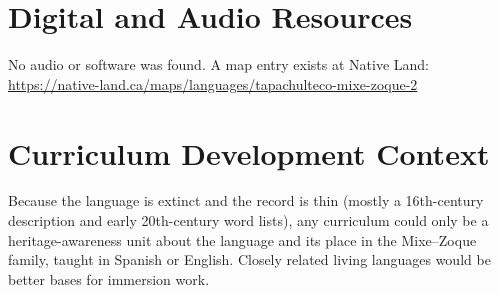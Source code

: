\documentclass[12pt]{article}
\begin{document}
\section{Digital and Audio Resources}
No audio or software was found. A map entry exists at Native Land: \url{https://native-land.ca/maps/languages/tapachulteco-mixe-zoque-2}

\section{Curriculum Development Context}
Because the language is extinct and the record is thin (mostly a 16th-century description and early 20th-century word lists), any curriculum could only be a heritage-awareness unit about the language and its place in the Mixe--Zoque family, taught in Spanish or English. Closely related living languages would be better bases for immersion work.
\end{document}

